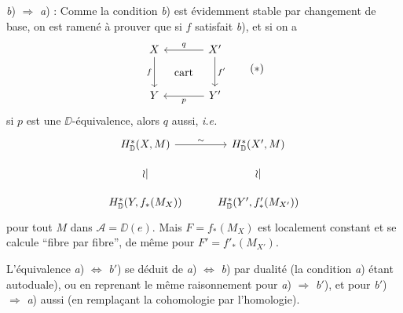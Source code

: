 \indent\textit{b}) $\Rightarrow$ \textit{a}) : Comme la condition \textit{b}) est évidemment stable par changement de base, on est ramené à prouver que si $f$ satisfait \textit{b}), et si on a
\[
\begin{tikzcd}[column sep=large, row sep=large]
X \arrow[d, "f"'] \arrow[dr, phantom, "\text{cart}"] & X' \arrow[l, "q"'] \arrow[d, "f'"] \\
Y & Y' \arrow[l, "p"]
\end{tikzcd}
\tag*{$(*)$}
\]
si $p$ est une $\DD$-équivalence, alors $q$ aussi, \textit{i.e.}
\[
\begin{tikzcd}[row sep=small]
H^*_{\DD}(X,M) \arrow[r, "\sim"] & H^*_{\DD}(X',M) \\
\wr| & \wr| \\
H^*_{\DD}(Y, f_*(M_X)) & H^*_{\DD}(Y', f'_*(M_{X'}))
\end{tikzcd}
\]
pour tout $M$ dans $\mathcal{A} = \DD(e)$. Mais $F = f_*(M_X)$ est localement constant et se calcule “fibre par fibre”, de même pour $F' = f'_*(M_{X'})$.


L'équivalence \textit{a}) $\Leftrightarrow$ \textit{b}$'$) se déduit de \textit{a}) $\Leftrightarrow$ \textit{b}) par dualité (la condition \textit{a}) étant autoduale), ou en reprenant le même raisonnement pour \textit{a}) $\Rightarrow$ \textit{b}$'$), et pour \textit{b}$'$) $\Rightarrow$ \textit{a}) aussi (en remplaçant la cohomologie par l'homologie).

